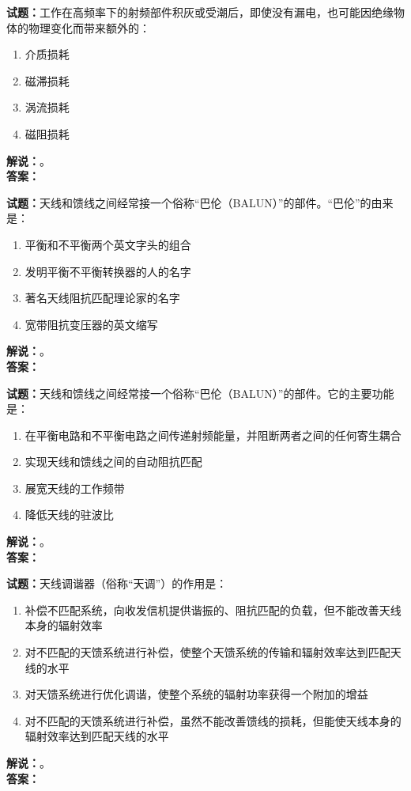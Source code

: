 \documentclass{ctexbook}
\begin{document}
\bigskip

\noindent\textbf{试题：}工作在高频率下的射频部件积灰或受潮后，即使没有漏电，也可能因绝缘物体的物理变化而带来额外的：
\begin{enumerate}[leftmargin=3em]
  \item 介质损耗
  \item 磁滞损耗
  \item 涡流损耗
  \item 磁阻损耗
\end{enumerate}
\noindent\textbf{解说：}\textbf{}。\\\noindent\textbf{答案：}

\bigskip

\noindent\textbf{试题：}天线和馈线之间经常接一个俗称“巴伦（BALUN）”的部件。“巴伦”的由来是：
\begin{enumerate}[leftmargin=3em]
  \item 平衡和不平衡两个英文字头的组合
  \item 发明平衡不平衡转换器的人的名字
  \item 著名天线阻抗匹配理论家的名字
  \item 宽带阻抗变压器的英文缩写
\end{enumerate}
\noindent\textbf{解说：}\textbf{}。\\\noindent\textbf{答案：}

\bigskip

\noindent\textbf{试题：}天线和馈线之间经常接一个俗称“巴伦（BALUN）”的部件。它的主要功能是：
\begin{enumerate}[leftmargin=3em]
  \item 在平衡电路和不平衡电路之间传递射频能量，并阻断两者之间的任何寄生耦合
  \item 实现天线和馈线之间的自动阻抗匹配
  \item 展宽天线的工作频带
  \item 降低天线的驻波比
\end{enumerate}
\noindent\textbf{解说：}\textbf{}。\\\noindent\textbf{答案：}

\bigskip

\noindent\textbf{试题：}天线调谐器（俗称“天调”）的作用是：
\begin{enumerate}[leftmargin=3em]
  \item 补偿不匹配系统，向收发信机提供谐振的、阻抗匹配的负载，但不能改善天线本身的辐射效率
  \item 对不匹配的天馈系统进行补偿，使整个天馈系统的传输和辐射效率达到匹配天线的水平
  \item 对天馈系统进行优化调谐，使整个系统的辐射功率获得一个附加的增益
  \item 对不匹配的天馈系统进行补偿，虽然不能改善馈线的损耗，但能使天线本身的辐射效率达到匹配天线的水平
\end{enumerate}
\noindent\textbf{解说：}\textbf{}。\\\noindent\textbf{答案：}
\end{document}

